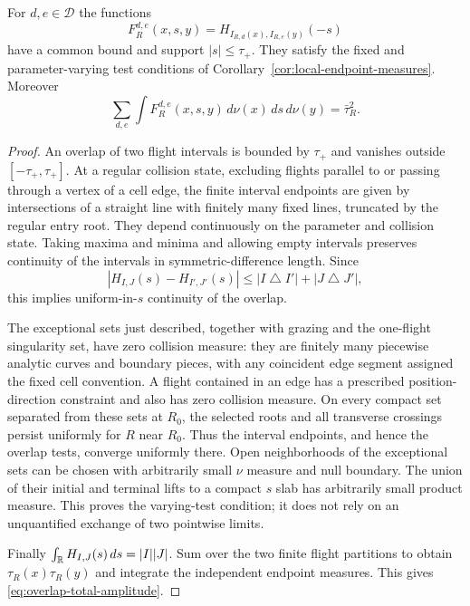 \begin{lemma}
\label{lem:overlap-local-admissibility}
For $d,e\in\mathcal D$ the functions
\[
 F_R^{d,e}(x,s,y)=H_{I_{R,d}(x),I_{R,e}(y)}(-s)
\]
have a common bound and support $|s|\le\tau_+$. They satisfy the
fixed and parameter-varying test conditions of
Corollary~\ref{cor:local-endpoint-measures}. Moreover
\begin{equation}\label{eq:overlap-total-amplitude}
 \sum_{d,e}\int F_R^{d,e}(x,s,y)\,d\nu(x)\,ds\,d\nu(y)
                                      =\bar\tau_R^2.
\end{equation}
\end{lemma}
\begin{proof}
An overlap of two flight intervals is bounded by $\tau_+$ and vanishes
outside $[-\tau_+,\tau_+]$. At a regular collision state, excluding
flights parallel to or passing through a vertex of a cell edge, the
finite interval endpoints are given by intersections of a straight
line with finitely many fixed lines, truncated by the regular entry
root. They depend continuously on the parameter and collision state.
Taking maxima and minima and allowing empty intervals preserves
continuity of the intervals in symmetric-difference length. Since
\[
 |H_{I,J}(s)-H_{I',J'}(s)|
                   \le |I\mathbin\triangle I'|+|J\mathbin\triangle J'|,
\]
this implies uniform-in-$s$ continuity of the overlap.

The exceptional sets just described, together with grazing and the
one-flight singularity set, have zero collision measure: they are
finitely many piecewise analytic curves and boundary pieces, with
any coincident edge segment assigned the fixed cell convention. A
flight contained in an edge has a prescribed position-direction
constraint and also has zero collision measure. On every compact set
separated from these sets at $R_0$, the selected roots and all
transverse crossings persist uniformly for $R$ near $R_0$. Thus the
interval endpoints, and hence the overlap tests, converge uniformly
there. Open neighborhoods of the exceptional sets can be chosen with
arbitrarily small $\nu$ measure and null boundary. The union of their
initial and terminal lifts to a compact $s$ slab has arbitrarily small
product measure. This proves the varying-test condition; it does not
rely on an unquantified exchange of two pointwise limits.

Finally $\int_\mathbb R H_{I,J}(s)\,ds=|I||J|$. Sum over the two finite
flight partitions to obtain $\tau_R(x)\tau_R(y)$ and integrate the
independent endpoint measures. This gives
\eqref{eq:overlap-total-amplitude}.
\end{proof}

